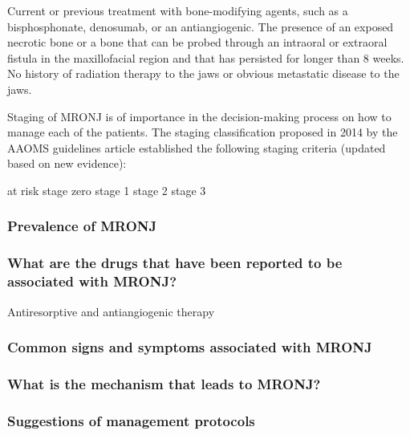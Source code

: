 \documentclass[
paper=landscape,
paper=160mm:90mm, %
fontsize=11pt, %
pagesize, %
parskip=half-, %
]{scrartcl} %
\theoremstyle{mythmstyle} %
\begin{document}
\begin{outline}
\1 Current or previous treatment with bone-modifying agents, such as a bisphosphonate, denosumab, or an antiangiogenic.
\1 The presence of an exposed necrotic bone or a bone that can be probed through an intraoral or extraoral fistula in the maxillofacial region and that has persisted for longer than 8 weeks.
\1 No history of radiation therapy to the jaws or obvious metastatic disease to the jaws.

\1 Staging of MRONJ is of importance in the decision-making process on how to manage each of the patients. The staging classification proposed in 2014 by the AAOMS guidelines article established the following staging criteria (updated based on new evidence):

    \2 at risk
    \2 stage zero
    \2 stage 1
    \2 stage 2
    \2 stage 3
\end{outline}
\clearpage

\subsubsection{Prevalence of MRONJ}

\subsubsection{What are the drugs that have been reported to be associated with MRONJ?}
Antiresorptive and antiangiogenic therapy


\subsubsection{Common signs and symptoms associated with MRONJ}

\subsubsection{What is the mechanism that leads to MRONJ?}

\subsubsection{Suggestions of management protocols}


\end{document}
